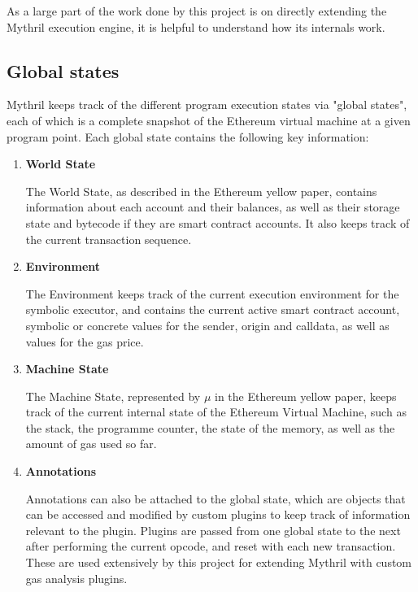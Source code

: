 As a large part of the work done by this project is on directly extending the Mythril execution engine,
it is helpful to understand how its internals work.


\subsection{Global states}

Mythril keeps track of the different program execution states via "global states", each of which is a complete
snapshot of the Ethereum virtual machine at a given program point. Each global state contains the following key
information:

\begin{enumerate}
    \item \textbf{World State}
    
    The World State, as described in the Ethereum yellow paper, contains information about each account
    and their balances, as well as their storage state and bytecode if they are smart contract accounts.
    It also keeps track of the current transaction sequence.

    \item \textbf{Environment}
    
    The Environment keeps track of the current execution environment for the symbolic executor,
    and contains the current active smart contract account, symbolic or concrete values for the sender, origin
    and calldata, as well as values for the gas price.

    \item \textbf{Machine State}
    
    The Machine State, represented by $\mu$ in the Ethereum yellow paper, keeps track of the current
    internal state of the Ethereum Virtual Machine, such as the stack, the programme counter, the state 
    of the memory, as well as the amount of gas used so far.

    \item \textbf{Annotations}
    
    Annotations can also be attached to the global state, which are objects that can be accessed and modified
    by custom plugins to keep track of information relevant to the plugin. Plugins are passed from one global state
    to the next after performing the current opcode, and reset with each new transaction.
    These are used extensively by this project for extending Mythril with custom gas analysis plugins.
\end{enumerate}

